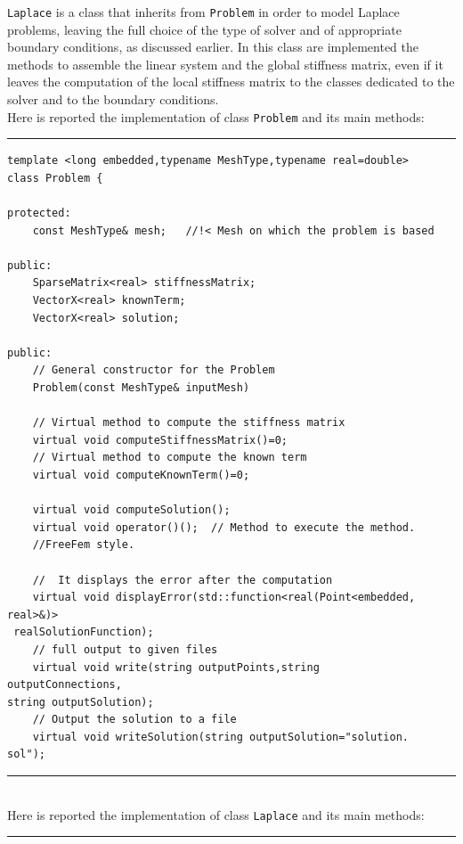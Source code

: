 \verb|Laplace| is a class that inherits from \verb|Problem| in order to model Laplace problems, leaving the full choice of the type of solver and of appropriate boundary conditions, as discussed earlier. In this class are implemented the methods to assemble the linear system and the global stiffness matrix, even if it leaves the computation of the local stiffness matrix to the classes dedicated to the solver and to the boundary conditions. \\

Here is reported the implementation of class \verb|Problem| and its main methods:

\noindent\rule{16cm}{1pt}
\begin{lstlisting}[caption=File \texttt{Problem.h}]
template <long embedded,typename MeshType,typename real=double>
class Problem {
	
protected:
    const MeshType& mesh;	//!< Mesh on which the problem is based

public:
    SparseMatrix<real> stiffnessMatrix;
    VectorX<real> knownTerm;
    VectorX<real> solution;
	
public:
    // General constructor for the Problem
    Problem(const MeshType& inputMesh)

    // Virtual method to compute the stiffness matrix
    virtual void computeStiffnessMatrix()=0;
    // Virtual method to compute the known term
    virtual void computeKnownTerm()=0;	

    virtual void computeSolution();
    virtual void operator()();  // Method to execute the method.
    //FreeFem style.

    //  It displays the error after the computation
    virtual void displayError(std::function<real(Point<embedded,
real>&)>
 realSolutionFunction);
    // full output to given files 
    virtual void write(string outputPoints,string 
outputConnections,
string outputSolution);	
    // Output the solution to a file
    virtual void writeSolution(string outputSolution="solution.
sol");
\end{lstlisting}
\noindent\rule{16cm}{1pt}\\

Here is reported the implementation of class \verb|Laplace| and its main methods:

\noindent\rule{16cm}{1pt}

